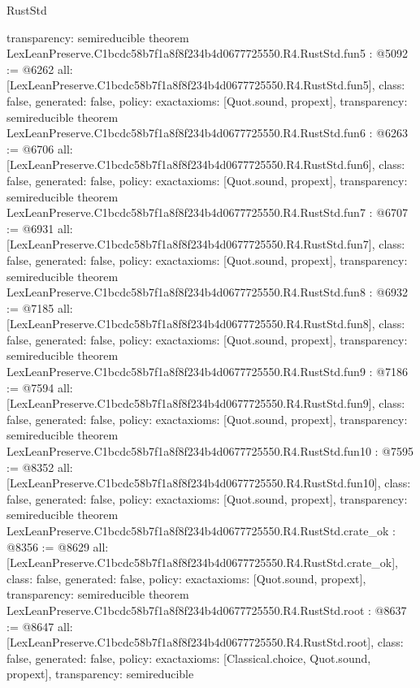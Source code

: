 \begin{lexlean}{RustStd}
\begin{coremodule}
{  transparency: semireducible
}
theorem LexLeanPreserve.C1bcdc58b7f1a8f8f234b4d0677725550.R4.RustStd.fun5 : @5092 := @6262 {
  all: [LexLeanPreserve.C1bcdc58b7f1a8f8f234b4d0677725550.R4.RustStd.fun5],
  class: false,
  generated: false,
  policy: exact{axioms: [Quot.sound, propext]},
  transparency: semireducible
}
theorem LexLeanPreserve.C1bcdc58b7f1a8f8f234b4d0677725550.R4.RustStd.fun6 : @6263 := @6706 {
  all: [LexLeanPreserve.C1bcdc58b7f1a8f8f234b4d0677725550.R4.RustStd.fun6],
  class: false,
  generated: false,
  policy: exact{axioms: [Quot.sound, propext]},
  transparency: semireducible
}
theorem LexLeanPreserve.C1bcdc58b7f1a8f8f234b4d0677725550.R4.RustStd.fun7 : @6707 := @6931 {
  all: [LexLeanPreserve.C1bcdc58b7f1a8f8f234b4d0677725550.R4.RustStd.fun7],
  class: false,
  generated: false,
  policy: exact{axioms: [Quot.sound, propext]},
  transparency: semireducible
}
theorem LexLeanPreserve.C1bcdc58b7f1a8f8f234b4d0677725550.R4.RustStd.fun8 : @6932 := @7185 {
  all: [LexLeanPreserve.C1bcdc58b7f1a8f8f234b4d0677725550.R4.RustStd.fun8],
  class: false,
  generated: false,
  policy: exact{axioms: [Quot.sound, propext]},
  transparency: semireducible
}
theorem LexLeanPreserve.C1bcdc58b7f1a8f8f234b4d0677725550.R4.RustStd.fun9 : @7186 := @7594 {
  all: [LexLeanPreserve.C1bcdc58b7f1a8f8f234b4d0677725550.R4.RustStd.fun9],
  class: false,
  generated: false,
  policy: exact{axioms: [Quot.sound, propext]},
  transparency: semireducible
}
theorem LexLeanPreserve.C1bcdc58b7f1a8f8f234b4d0677725550.R4.RustStd.fun10 : @7595 := @8352 {
  all: [LexLeanPreserve.C1bcdc58b7f1a8f8f234b4d0677725550.R4.RustStd.fun10],
  class: false,
  generated: false,
  policy: exact{axioms: [Quot.sound, propext]},
  transparency: semireducible
}
theorem LexLeanPreserve.C1bcdc58b7f1a8f8f234b4d0677725550.R4.RustStd.crate_ok : @8356 := @8629 {
  all: [LexLeanPreserve.C1bcdc58b7f1a8f8f234b4d0677725550.R4.RustStd.crate_ok],
  class: false,
  generated: false,
  policy: exact{axioms: [Quot.sound, propext]},
  transparency: semireducible
}
theorem LexLeanPreserve.C1bcdc58b7f1a8f8f234b4d0677725550.R4.RustStd.root : @8637 := @8647 {
  all: [LexLeanPreserve.C1bcdc58b7f1a8f8f234b4d0677725550.R4.RustStd.root],
  class: false,
  generated: false,
  policy: exact{axioms: [Classical.choice, Quot.sound, propext]},
  transparency: semireducible
}


\end{coremodule}
\end{lexlean}
